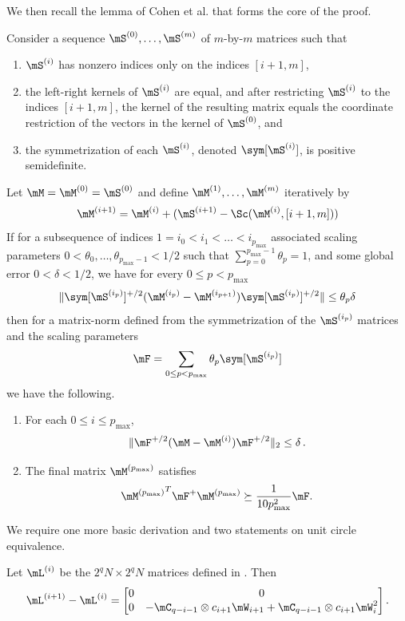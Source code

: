 \noindent
We then recall the lemma of Cohen et al. \cite{CKKPPRS18} %
that forms the core of the 
proof. %
%
%
%
\begin{lemma}  %
\label{app:sc}
  Consider a sequence
%
%
$\mS^{(0)},\ldots,\mS^{(m)}$
of $m$-by-$m$ matrices %
such that  %
%
%
%
\begin{enumerate}
    \item $\mS^{(i)}$ has nonzero indices only on the indices $[i+1,m]$,
    \item the left-right kernels of $\mS^{(i)}$ are equal, and after restricting $\mS^{(i)}$ to the indices $[i+1,m]$, the kernel of the resulting matrix equals the coordinate restriction of the vectors in the kernel of $\mS^{(0)}$, and  %
    \item the symmetrization of each $\mS^{(i)}$, denoted $\sym[\mS^{(i)}]$, is positive
%
semidefinite.  %
\end{enumerate}
Let $\mM=\mM^{(0)}=\mS^{(0)}$ and define $\mM^{(1)},\ldots, \mM^{(m)}$ iteratively by
$$\mM^{(i+1)} = \mM^{(i)} + (\mS^{(i+1)} - \Sc(\mM^{(i)},[i+1,m]))$$
If for a subsequence of indices $1 =i_0<i_1<\ldots<  i_{p_{\max}}$ associated scaling parameters $0< \theta_0,\ldots,\theta_{p_{\max}-1}<1/2$ such that $\sum_{p=0}^{p_{\max}-1}\theta_p=1$, and some global error $0< \delta <1/2$, we have for 
every $0\leq p < p_{\max}$ %
$$\|\sym[\mS^{(i_p)}]^{+/2}(\mM^{(i_p)}-\mM^{(i_{p+1})})\sym[\mS^{(i_p)}]^{+/2}\| \leq \theta_p\delta$$
then for a matrix-norm defined from the symmetrization of the $\mS^{(i_p)}$ matrices and the scaling parameters
$$\mF = \sum_{0\leq p<p_{\max}}\theta_p \sym[\mS^{(i_p)}]$$
we have the following.  %
\begin{enumerate}
    \item For each $0\leq i\leq p_{\max}$,
    $$\|\mF^{+/2}(\mM-\mM^{(i)})\mF^{+/2}\|_2 \leq \delta\,.$$
    \item The final matrix $\mM^{(p_{\max})}$ satisfies
    $${\mM^{(p_{\max})}}^T\mF^+\mM^{(p_{\max})}\succeq \frac{1}{10p^2_{\max}}\mF.$$
\end{enumerate}
\end{lemma}

We require one more basic derivation and two statements on unit circle equivalence.
%
\begin{lemma} %
\label{app:diff}
Let $\mL^{(i)}$ be the $2^qN\times 2^qN$ matrices defined in  . Then
$$\mL^{(i+1)}-\mL^{(i)} = \begin{bmatrix} 0 & 0\\ 0 & -\mC_{q-i-1}\otimes c_{i+1}\mW_{i+1}+\mC_{q-i-1}\otimes c_{i+1}\mW_{i}^2\end{bmatrix}.$$
\end{lemma}

